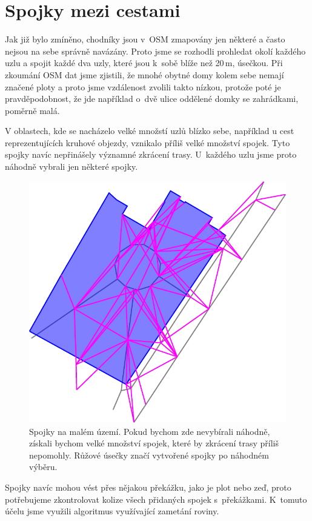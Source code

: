 \section{Spojky mezi cestami}
Jak již bylo zmíněno, chodníky jsou v~OSM zmapovány jen některé a často nejsou
na sebe správně navázány. Proto jsme se rozhodli prohledat okolí každého uzlu a
spojit každé dva uzly, které jsou k~sobě blíže než 20\,m, úsečkou. Při zkoumání
OSM dat jsme zjistili, že mnohé obytné domy kolem sebe nemají značené ploty a
proto jsme vzdálenost zvolili takto nízkou, protože poté je pravděpodobnost, že
jde například o~dvě ulice oddělené domky se zahrádkami, poměrně malá.  

V oblastech, kde se nacházelo velké množstí uzlů blízko sebe, například u cest
reprezentujících kruhové objezdy, vznikalo příliš velké množství spojek. Tyto
spojky navíc nepřinášely významné zkrácení trasy. U~každého uzlu jsme proto
náhodně vybrali jen některé spojky.

\begin{figure}[h]
	\centering
	\includegraphics{../img/spojky.pdf}
	\caption{Spojky na malém území. Pokud bychom zde nevybírali náhodně, získali
	bychom velké množství spojek, které by zkrácení trasy příliš nepomohly.
	Růžové úsečky značí vytvořené spojky po náhodném výběru.}
	\label{fig:spojky}
\end{figure}

Spojky navíc mohou vést přes nějakou překážku, jako je plot nebo zeď, proto
potřebujeme zkontrolovat kolize všech přidaných spojek s~překážkami. K~tomuto
účelu jsme využili algoritmus využívající zametání roviny.


